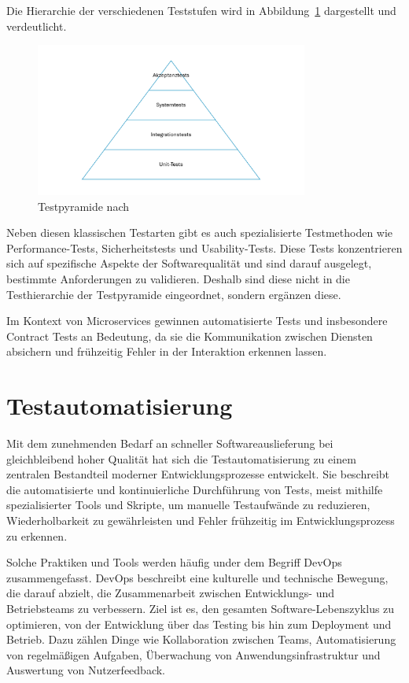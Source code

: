 Die Hierarchie der verschiedenen Teststufen wird in Abbildung~\ref{fig:testpyramid} dargestellt und verdeutlicht.

\begin{figure}[ht]
    \centering
    \includegraphics[width=0.8\textwidth]{figures/Testpyramide}
    \caption{Testpyramide nach \cite{linzBasiswissenSoftwaretest2024}}
    \label{fig:testpyramid}
\end{figure}

Neben diesen klassischen Testarten gibt es auch spezialisierte Testmethoden wie Performance-Tests, Sicherheitstests und Usability-Tests.
Diese Tests konzentrieren sich auf spezifische Aspekte der Softwarequalität und sind darauf ausgelegt, bestimmte Anforderungen zu validieren.
Deshalb sind diese nicht in die Testhierarchie der Testpyramide eingeordnet, sondern ergänzen diese.

Im Kontext von Microservices gewinnen automatisierte Tests und insbesondere Contract Tests an Bedeutung, da sie die Kommunikation zwischen Diensten absichern und frühzeitig Fehler in der Interaktion erkennen lassen.

\section{Testautomatisierung}\label{sec:foundation_testautomation}

Mit dem zunehmenden Bedarf an schneller Softwareauslieferung bei gleichbleibend hoher Qualität hat sich die Testautomatisierung zu einem zentralen Bestandteil moderner Entwicklungsprozesse entwickelt.
Sie beschreibt die automatisierte und kontinuierliche Durchführung von Tests, meist mithilfe spezialisierter Tools und Skripte, um manuelle Testaufwände zu reduzieren, Wiederholbarkeit zu gewährleisten und Fehler frühzeitig im Entwicklungsprozess zu erkennen.

Solche Praktiken und Tools werden häufig under dem Begriff \gls{DevOps} zusammengefasst.
\gls{DevOps} beschreibt eine kulturelle und technische Bewegung, die darauf abzielt, die Zusammenarbeit zwischen Entwicklungs- und Betriebsteams zu verbessern.
Ziel ist es, den gesamten Software-Lebenszyklus zu optimieren, von der Entwicklung über das Testing bis hin zum \gls{Deployment} und Betrieb.
Dazu zählen Dinge wie Kollaboration zwischen Teams, Automatisierung von regelmäßigen Aufgaben, Überwachung von
Anwendungsinfrastruktur und Auswertung von Nutzerfeedback.


